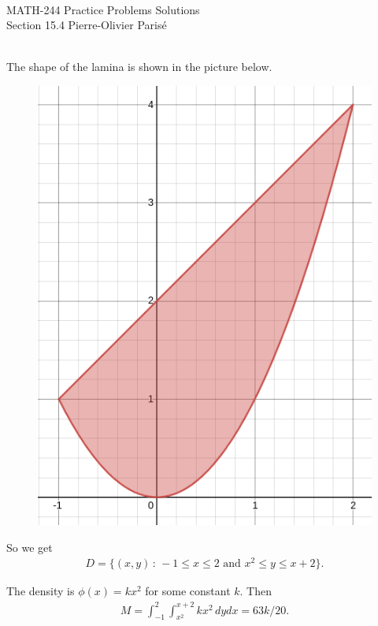 


	\noindent \hrulefill \\
	MATH-244 \semester \hfill Practice Problems Solutions\\
	Section 15.4 \hfill Pierre-Olivier Paris{\'e} \\\vspace*{-1cm}
	
	\noindent\hrulefill
	
	\spc	

	\\
	The shape of the lamina is shown in the picture below.
		\begin{figure}[h]
		\centering
		\includegraphics[scale=0.5]{exo8_15-4.png}
		\end{figure}
	So we get
		\begin{align*}
		D = \{ (x, y) \, : \, -1 \leq x \leq 2 \text{ and } x^2 \leq y \leq x + 2 \}. 
		\end{align*}
	
	The density is $\phi (x) = k x^2$ for some constant $k$. Then
		\begin{align*}
		M = \int_{-1}^2 \int_{x^2}^{x + 2} k x^2 \, dy dx = 63k/20.
		\end{align*}
		
